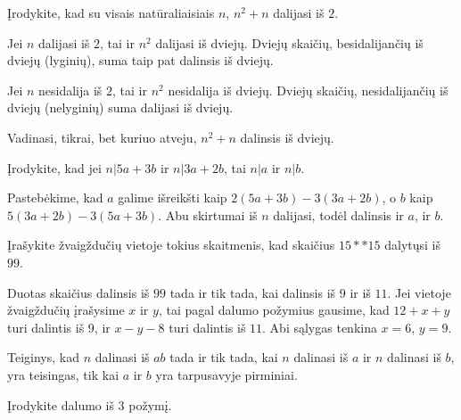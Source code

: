 \begin{pavnr} Įrodykite, kad su visais natūraliaisiais $n$, $n^2 + n$
  dalijasi iš $2$.  
\end{pavnr}

\begin{sprendimas}
  Jei $n$ dalijasi iš $2$, tai ir $n^2$ dalijasi iš dviejų. Dviejų skaičių,
  besidalijančių iš dviejų (lyginių), suma taip pat dalinsis iš dviejų.

  Jei $n$ nesidalija iš $2$, tai ir $n^2$ nesidalija iš dviejų. Dviejų
  skaičių, nesidalijančių iš dviejų (nelyginių) suma dalijasi iš dviejų. 

  Vadinasi, tikrai, bet kuriuo atveju, $n^2 + n$ dalinsis iš dviejų.
\end{sprendimas}

\begin{pavnr} 
  Įrodykite, kad jei $n|5a + 3b$ ir $n|3a+2b$, tai $n|a$ ir $n|b$.
\end{pavnr}

\begin{sprendimas}
Pastebėkime, kad $a$ galime išreikšti kaip $2(5a+3b)-3(3a+2b)$, o $b$ kaip
$5(3a+2b)-3(5a+3b)$. Abu skirtumai iš $n$ dalijasi, todėl dalinsis ir $a$,
ir $b$. 
\end{sprendimas}

\begin{pavnr}
  Įrašykite žvaigždučių vietoje tokius skaitmenis, kad skaičius $15**15$
  dalytųsi iš $99$.  
\end{pavnr}

\begin{sprendimas}
  Duotas skaičius dalinsis iš $99$ tada ir tik tada, kai dalinsis iš
  $9$ ir iš $11$. Jei vietoje žvaigždučių įrašysime $x$ ir $y$, tai pagal dalumo
  požymius gausime, kad $12+x+y$ turi dalintis iš $9$, ir $x-y-8$ turi
  dalintis iš $11$. Abi sąlygas tenkina $x=6$, $y=9$.
\end{sprendimas}

\begin{pastaba}
  Teiginys, kad $n$ dalinasi iš $ab$ tada ir tik tada, kai $n$ dalinasi iš
  $a$ ir $n$ dalinasi iš $b$, yra teisingas, tik kai $a$ ir $b$ yra
  tarpusavyje pirminiai.  
\end{pastaba}


\begin{pavnr}
  Įrodykite dalumo iš $3$ požymį. 
\end{pavnr}

